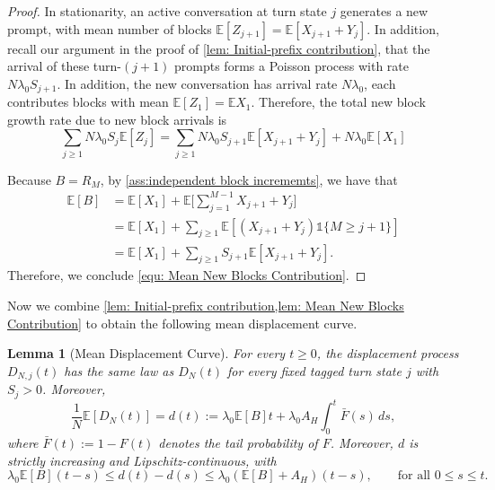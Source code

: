 \documentclass{article}
\newtheorem{lemma}[lemma]{Lemma}
\theoremstyle{definition}
\newcommand{\E}{\mathbb E}
\newcommand{\one}{\mathds{1}}
\begin{document}
\begin{proof}
    In stationarity, an active conversation at turn state $j$ generates a new prompt, with mean number of blocks $\E [Z_{j+1}] = \E[X_{j+1}+Y_{j}]$. In addition, recall our argument in the proof of \cref{lem: Initial-prefix contribution}, that the arrival of these turn-$(j+1)$ prompts forms a Poisson process with rate $N \lambda_0 S_{j+1}$. In addition, the new conversation has arrival rate $N \lambda_0$, each contributes blocks with mean $\E [Z_1] = \E X_1$. Therefore, the total new block growth rate due to new block arrivals is 
    \begin{equation}
    \label{equ: new block growth rate}
        \sum\limits_{j\geq 1} N\lambda_0 S_{j} \E[Z_j] =  \sum\limits_{j\geq 1} N\lambda_0S_{j+1}\E [X_{j+1}+Y_{j}] + N \lambda_0 \E [X_1]
    \end{equation}
    
    Because $B=R_M$, by \cref{ass:independent block incrememts}, we have that 
    \begin{align*}
        \E[B] & = \E[X_1] + \E\Big[ \sum\limits_{j=1}^{M-1} X_{j+1}+Y_j \Big]\\
        &  = \E [X_1] + \sum_{j\geq1} \E[ (X_{j+1}+Y_j)\one\{M\geq j+1\} ] \\
        & = \E [X_1] + \sum_{j\geq1} S_{j+1}\E[X_{j+1}+Y_{j}].
    \end{align*}
    Therefore, we conclude \eqref{equ: Mean New Blocks Contribution}.
\end{proof}


Now we combine \cref{lem: Initial-prefix contribution,lem: Mean New Blocks Contribution} to obtain the following mean displacement curve.

\begin{lemma}[Mean Displacement Curve]
\label{lem: Mean Displacement Curve}
    For every $t\geq0$, the displacement process $D_{N,j}(t)$ has the same law as $D_N(t)$ for every fixed tagged turn state $j$ with $S_j>0$. Moreover,
    \begin{equation}
    \label{equ: Mean Displacement Curve}
        \frac{1}{N}\E[D_N(t)]=d(t):= \lambda_0\E[B]t + \lambda_0A_H\int_0^t\bar F(s)\,ds,
    \end{equation}
    where $\bar F(t):=1-F(t)$ denotes the tail probability of $F$. Moreover, $d$ is strictly increasing and Lipschitz-continuous, with
    \begin{equation*}
        \lambda_0\E[B](t-s) \leq d(t)-d(s) \leq \lambda_0(\E[B]+A_H)(t-s), \qquad\text{for all } 0\leq s\leq t.
    \end{equation*}
\end{lemma}
\end{document}

